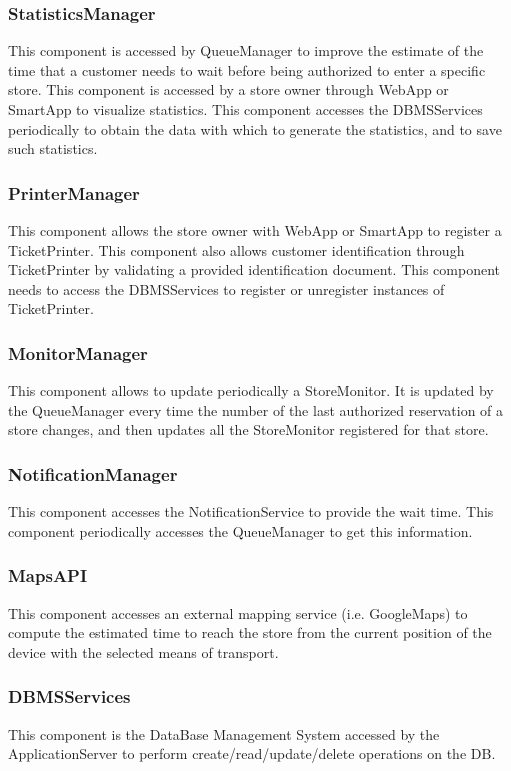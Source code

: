 \subsubsection{StatisticsManager}
This component is accessed by QueueManager to improve the estimate of the time that a customer needs to wait before being authorized to enter a specific store. This component is accessed by a store owner through WebApp or SmartApp to visualize statistics. This component accesses the DBMSServices periodically to obtain the data with which to generate the statistics, and to save such statistics.
\subsubsection{PrinterManager}
This component allows the store owner with WebApp or SmartApp to register a TicketPrinter. This component also allows customer identification through TicketPrinter by validating a provided identification document. This component needs to access the DBMSServices to register or unregister instances of TicketPrinter.
\subsubsection{MonitorManager}
This component allows to update periodically a StoreMonitor. It is updated by the QueueManager every time the number of the last authorized reservation of a store changes, and then updates all the StoreMonitor registered for that store.
\subsubsection{NotificationManager}
This component accesses the NotificationService to provide the wait time. This component periodically accesses the QueueManager to get this information.
\subsubsection{MapsAPI}
This component accesses an external mapping service (i.e. GoogleMaps) to compute the estimated time to reach the store from the current position of the device with the selected means of transport.
\subsubsection{DBMSServices}
This component is the DataBase Management System accessed by the ApplicationServer to perform create/read/update/delete operations on the DB.
